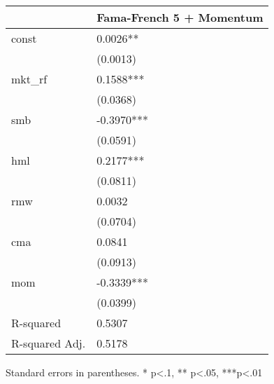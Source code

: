 \begin{table}
\caption{}
\label{}
\begin{center}
\begin{tabular}{ll}
\hline
               & Fama-French 5 + Momentum  \\
\hline
const          & 0.0026**                  \\
               & (0.0013)                  \\
mkt\_rf        & 0.1588***                 \\
               & (0.0368)                  \\
smb            & -0.3970***                \\
               & (0.0591)                  \\
hml            & 0.2177***                 \\
               & (0.0811)                  \\
rmw            & 0.0032                    \\
               & (0.0704)                  \\
cma            & 0.0841                    \\
               & (0.0913)                  \\
mom            & -0.3339***                \\
               & (0.0399)                  \\
R-squared      & 0.5307                    \\
R-squared Adj. & 0.5178                    \\
\hline
\end{tabular}
\end{center}
\end{table}
\bigskip
Standard errors in parentheses. \newline 
* p<.1, ** p<.05, ***p<.01
